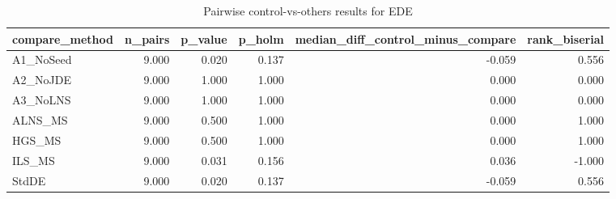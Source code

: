 \begin{table}[!t]
\centering
\caption{Pairwise control-vs-others results for EDE}
\label{tab:posthoc_holm_generated}
\begin{tabular}{lrrrrr}
\toprule
compare_method & n_pairs & p_value & p_holm & median_diff_control_minus_compare & rank_biserial \\
\midrule
A1_NoSeed & 9.000 & 0.020 & 0.137 & -0.059 & 0.556 \\
A2_NoJDE & 9.000 & 1.000 & 1.000 & 0.000 & 0.000 \\
A3_NoLNS & 9.000 & 1.000 & 1.000 & 0.000 & 0.000 \\
ALNS_MS & 9.000 & 0.500 & 1.000 & 0.000 & 1.000 \\
HGS_MS & 9.000 & 0.500 & 1.000 & 0.000 & 1.000 \\
ILS_MS & 9.000 & 0.031 & 0.156 & 0.036 & -1.000 \\
StdDE & 9.000 & 0.020 & 0.137 & -0.059 & 0.556 \\
\bottomrule
\end{tabular}

\end{table}